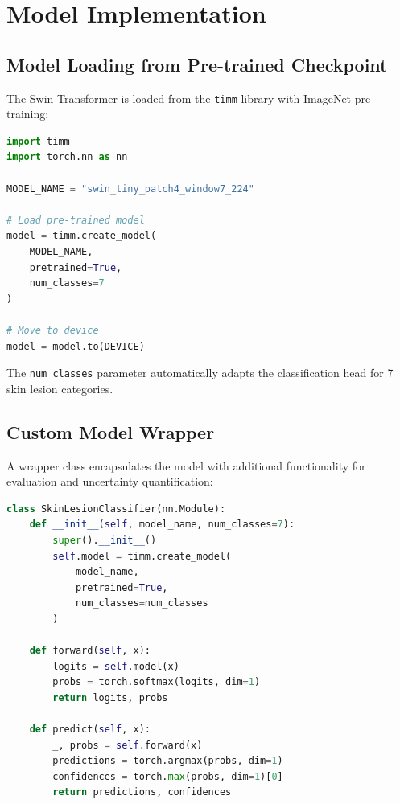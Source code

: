 \section{Model Implementation}

\subsection{Model Loading from Pre-trained Checkpoint}

The Swin Transformer is loaded from the \texttt{timm} library with ImageNet pre-training:

\begin{lstlisting}[language=Python, caption=Loading Swin Transformer Model]
import timm
import torch.nn as nn

MODEL_NAME = "swin_tiny_patch4_window7_224"

# Load pre-trained model
model = timm.create_model(
    MODEL_NAME, 
    pretrained=True, 
    num_classes=7
)

# Move to device
model = model.to(DEVICE)
\end{lstlisting}

The \texttt{num\_classes} parameter automatically adapts the classification head for 7 skin lesion categories.

\subsection{Custom Model Wrapper}

A wrapper class encapsulates the model with additional functionality for evaluation and uncertainty quantification:

\begin{lstlisting}[language=Python, caption=Custom Model Wrapper]
class SkinLesionClassifier(nn.Module):
    def __init__(self, model_name, num_classes=7):
        super().__init__()
        self.model = timm.create_model(
            model_name, 
            pretrained=True, 
            num_classes=num_classes
        )
        
    def forward(self, x):
        logits = self.model(x)
        probs = torch.softmax(logits, dim=1)
        return logits, probs
    
    def predict(self, x):
        _, probs = self.forward(x)
        predictions = torch.argmax(probs, dim=1)
        confidences = torch.max(probs, dim=1)[0]
        return predictions, confidences
\end{lstlisting}

